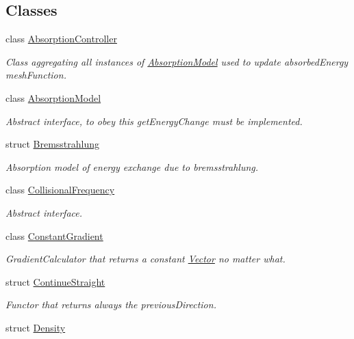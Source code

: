 \subsection*{Classes}
\begin{DoxyCompactItemize}
\item 
class \hyperlink{classraytracer_1_1AbsorptionController}{Absorption\+Controller}
\begin{DoxyCompactList}\small\item\em Class aggregating all instances of \hyperlink{classraytracer_1_1AbsorptionModel}{Absorption\+Model} used to update absorbed\+Energy mesh\+Function. \end{DoxyCompactList}\item 
class \hyperlink{classraytracer_1_1AbsorptionModel}{Absorption\+Model}
\begin{DoxyCompactList}\small\item\em Abstract interface, to obey this get\+Energy\+Change must be implemented. \end{DoxyCompactList}\item 
struct \hyperlink{structraytracer_1_1Bremsstrahlung}{Bremsstrahlung}
\begin{DoxyCompactList}\small\item\em Absorption model of energy exchange due to bremsstrahlung. \end{DoxyCompactList}\item 
class \hyperlink{classraytracer_1_1CollisionalFrequency}{Collisional\+Frequency}
\begin{DoxyCompactList}\small\item\em Abstract interface. \end{DoxyCompactList}\item 
class \hyperlink{classraytracer_1_1ConstantGradient}{Constant\+Gradient}
\begin{DoxyCompactList}\small\item\em Gradient\+Calculator that returns a constant \hyperlink{classraytracer_1_1Vector}{Vector} no matter what. \end{DoxyCompactList}\item 
struct \hyperlink{structraytracer_1_1ContinueStraight}{Continue\+Straight}
\begin{DoxyCompactList}\small\item\em Functor that returns always the previous\+Direction. \end{DoxyCompactList}\item 
struct \hyperlink{structraytracer_1_1Density}{Density}

\end{DoxyCompactItemize}
